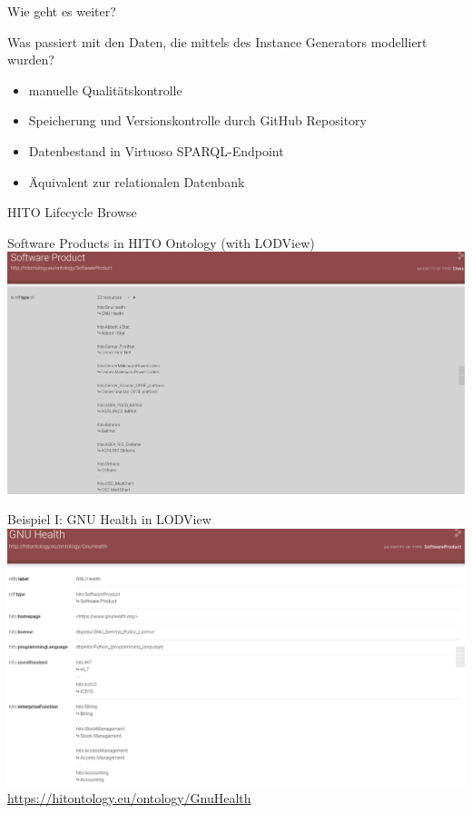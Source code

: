 \documentclass[aspectratio=1610,12pt]{beamer}
\begin{document}
\begin{frame}{Wie geht es weiter?}
  \begin{spacing}{1.5}
    Was passiert mit den Daten, die mittels des Instance Generators modelliert wurden?
  \begin{itemize}
    \item manuelle Qualitätskontrolle
    \item Speicherung und Versionskontrolle durch GitHub Repository
    \item Datenbestand in Virtuoso SPARQL-Endpoint
    \item Äquivalent zur relationalen Datenbank
  \end{itemize}
\end{spacing}
\end{frame}

\begin{frame}{HITO Lifecycle Browse}
  \centering
  \vspace{-0.5cm}
\end{frame}

\begin{frame}{Software Products in HITO Ontology (with LODView)}
\centering
\includegraphics[width=\textwidth]{img/softwareproduct.png}
\end{frame}

\begin{frame}{Beispiel I: GNU Health in LODView}
\vspace{-0.3cm}
\centering
\includegraphics[width=.95\textwidth]{img/GnuHealth.png}
\footnotesize{\url{https://hitontology.eu/ontology/GnuHealth}}
\end{frame}
\end{document}
